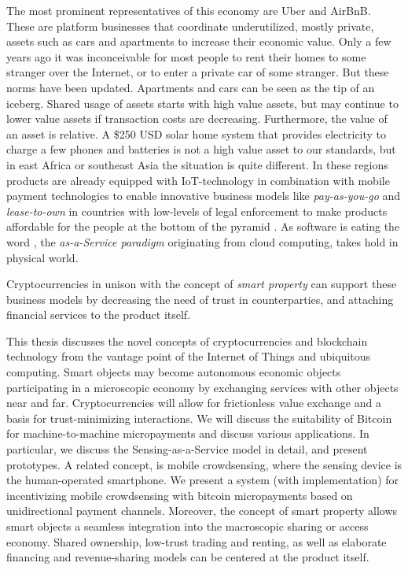 The most prominent representatives of this economy are Uber and AirBnB. These are platform businesses that coordinate underutilized, mostly private, assets such as cars and apartments to increase their economic value. Only a few years ago it was inconceivable for most people to rent their homes to some stranger over the Internet, or to enter a private car of some stranger. But these norms have been updated. Apartments and cars can be seen as the tip of an iceberg. Shared usage of assets starts with high value assets, but may continue to lower value assets if transaction costs are decreasing. Furthermore, the value of an asset is relative. A \$250 USD solar home system that provides electricity to charge a few phones and batteries is not a high value asset to our standards, but in east Africa or southeast Asia the situation is quite different. In these regions products are already equipped with IoT-technology in combination with mobile payment technologies to enable innovative business models like \emph{pay-as-you-go} and \emph{lease-to-own} in countries with low-levels of legal enforcement to make products affordable for the people at the bottom of the pyramid \parencite{ISI:000351842100012}. As software is eating the word \parencite{andreessen2011software}, the \emph{as-a-Service paradigm} originating from cloud computing, takes hold in physical world. 

Cryptocurrencies in unison with the concept of \emph{smart property} \parencite{szabo1997idea,smartproperty2011} can support these business models by decreasing the need of trust in counterparties, and attaching financial services to the product itself.

This thesis discusses the novel concepts of cryptocurrencies and blockchain technology from the vantage point of the Internet of Things and ubiquitous computing. Smart objects may become autonomous economic objects participating in a microscopic economy by exchanging services with other objects near and far. Cryptocurrencies will allow for frictionless value exchange and a basis for trust-minimizing interactions. We will discuss the suitability of Bitcoin for machine-to-machine micropayments and discuss various applications. In particular, we discuss the Sensing-as-a-Service model in detail, and present prototypes. A related concept, is mobile crowdsensing, where the sensing device is the human-operated smartphone. We present a system (with implementation) for incentivizing mobile crowdsensing with bitcoin micropayments based on unidirectional payment channels.
Moreover, the concept of smart property allows smart objects a seamless integration into the macroscopic sharing or access economy. Shared ownership, low-trust trading and renting, as well as elaborate financing and revenue-sharing models can be centered at the product itself. 


